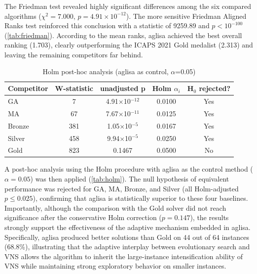 \documentclass[]{interact}
\begin{document}
The Friedman test revealed highly significant differences among the six compared algorithms ($\chi^2 = 7.000$, $p = 4.91 \times 10^{-12}$). The more sensitive Friedman Aligned Ranks test reinforced this conclusion with a statistic of 9259.89 and $p < 10^{-100}$ (\autoref{tab:friedman}). According to the mean ranks, \gls{aglisa} achieved the best overall ranking (1.703), clearly outperforming the ICAPS 2021 Gold medalist (2.313) and leaving the remaining competitors far behind.

\begin{table}[htp]
\centering
\caption{Holm post-hoc analysis (\gls{aglisa} as control, $\alpha$=0.05)}
\label{tab:holm}
\begin{tabular}{lcccc}
\toprule
Competitor & W-statistic & unadjusted p & Holm $\alpha_i$ & H$_0$ rejected? \\
\midrule
GA         & 7   & 4.91$\times$10$^{-12}$ & 0.0100 & Yes \\
MA         & 67  & 7.67$\times$10$^{-11}$ & 0.0125 & Yes \\
Bronze     & 381 & 1.05$\times$10$^{-5}$  & 0.0167 & Yes \\
Silver     & 458 & 9.94$\times$10$^{-5}$  & 0.0250 & Yes \\
Gold       & 823 & 0.1467                 & 0.0500 & No  \\
\bottomrule
\end{tabular}%
\end{table}

A post-hoc analysis using the Holm procedure with \gls{aglisa} as the control method ($\alpha = 0.05$) was then applied (\autoref{tab:holm}). The null hypothesis of equivalent performance was rejected for GA, MA, Bronze, and Silver (all Holm-adjusted $p \leq 0.025$), confirming that \gls{aglisa} is statistically superior to these four baselines. Importantly, although the comparison with the Gold solver did not reach significance after the conservative Holm correction ($p = 0.147$), the results strongly support the effectiveness of the adaptive mechanism embedded in \gls{aglisa}. Specifically, \gls{aglisa} produced better solutions than Gold on 44 out of 64 instances (68.8\%), illustrating that the adaptive interplay between evolutionary search and VNS allows the algorithm to inherit the large-instance intensification ability of VNS while maintaining strong exploratory behavior on smaller instances.
\end{document}
